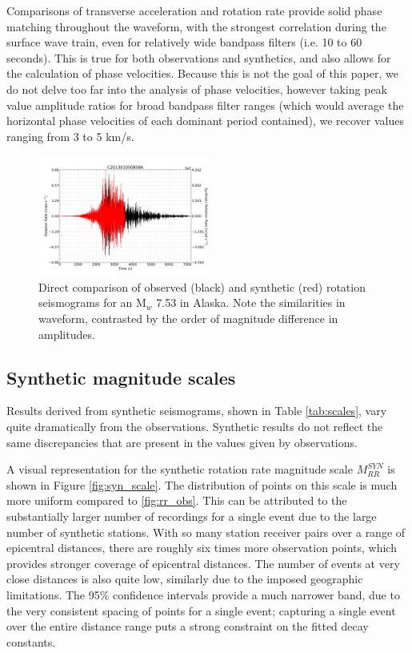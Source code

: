 \documentclass{gji}
\begin{document}

Comparisons of transverse acceleration and rotation rate provide solid phase matching throughout the waveform, with the strongest correlation during the surface wave train, even for relatively wide bandpass filters (i.e. 10 to 60 seconds). This is true for both observations and synthetics, and also allows for the calculation of phase velocities. Because this is not the goal of this paper, we do not delve too far into the analysis of phase velocities, however taking peak value amplitude ratios for broad bandpass filter ranges (which would average the horizontal phase velocities of each dominant period contained), we recover values ranging from 3 to 5 km/s. 

\begin{figure}
\centerline{\includegraphics[width=0.5\textwidth]{C201301050858A_compareBJZ}}
\caption{Direct comparison of observed (black) and synthetic (red) rotation seismograms for an M$_w$ 7.53 in Alaska. Note the similarities in waveform, contrasted by the order of magnitude difference in amplitudes.}
\label{fig:both}
\end{figure}

\subsection{Synthetic magnitude scales}
Results derived from synthetic seismograms, shown in Table \ref{tab:scales}, vary quite dramatically from the observations. Synthetic results do not reflect the same discrepancies that are present in the values given by observations.

A visual representation for the synthetic rotation rate magnitude scale $M_{RR}^{SYN}$ is shown in Figure \ref{fig:syn_scale}. The distribution of points on this scale is much more uniform compared to \ref{fig:rr_obs}. This can be attributed to the substantially larger number of recordings for a single event due to the large number of synthetic stations. With so many station receiver pairs over a range of epicentral distances, there are roughly six times more observation points, which provides stronger coverage of epicentral distances. The number of events at very close distances is also quite low, similarly due to the imposed geographic limitations. The 95\% confidence intervals provide a much narrower band, due to the very consistent spacing of points for a single event; capturing a single event over the entire distance range puts a strong constraint on the fitted decay constants.
\end{document}
